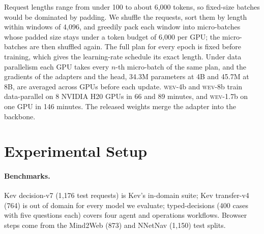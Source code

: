 \documentclass{article}
\newcommand{\wev}{\textsc{wev}\xspace}
\begin{document}
Request lengths range from under 100 to about 6{,}000 tokens, so fixed-size batches would be dominated by padding. We
shuffle the requests, sort them by length within windows of 4{,}096, and greedily pack each window into micro-batches
whose padded size stays under a token budget of 6{,}000 per GPU; the micro-batches are then shuffled again. The full
plan for every epoch is fixed before training, which gives the learning-rate schedule its exact length. Under data
parallelism each GPU takes every $n$-th micro-batch of the same plan, and the gradients of the adapters and the head,
34.3M parameters at 4B and 45.7M at 8B, are averaged across GPUs before each update. \wev-4b and \wev-8b train data-parallel on 8
NVIDIA H20 GPUs in 66 and 89 minutes, and \wev-1.7b on one GPU in 146 minutes. The released weights merge the adapter
into the backbone.

\begin{table}[t]
\centering
\caption{Training mixture after conversion. Weight is the number of repetitions per epoch. $^\dagger$\wev-4b only.}
\label{tab:data}
\end{table}

\section{Experimental Setup}
\label{sec:setup}

\paragraph{Benchmarks.} Kev decision-v7 (1{,}176 test requests) is Kev's in-domain suite; Kev transfer-v4 (764) is
out of domain for every model we evaluate; typed-decisions (400 cases with five questions each) covers four agent and
operations workflows. Browser steps come from the Mind2Web (873) and NNetNav (1{,}150) test splits.
\end{document}
